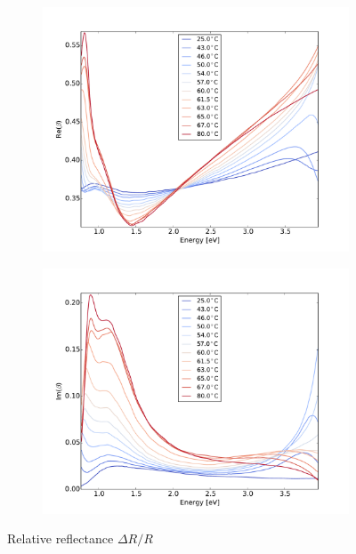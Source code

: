 \begin{figure}
    \begin{subfigure}[b]{0.49\textwidth}
        \centering
        \includegraphics[width=\textwidth]{Results/Sim4/re_beta.pdf}
        \caption{}
        \label{fig:2}
    \end{subfigure}
    \begin{subfigure}[b]{0.49\textwidth}
        \centering
        \includegraphics[width=\textwidth]{Results/Sim4/im_beta.pdf}
        \caption{}
        \label{fig:2}
    \end{subfigure}
    \caption{Relative reflectance $\Delta R/R$}
    \label{fig:}
\end{figure}
%




